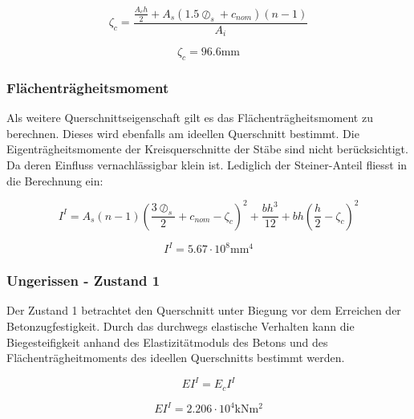 \documentclass[
  12pt,
  letterpaper,
  egregdoesnotlikesansseriftitles]{scrreprt}
\begin{document}
\begin{equation}\zeta_{c} = \frac{\frac{A_{c} h}{2} + A_{s} \left(1.5 \oslash_{s} + c_{nom}\right) \left(n - 1\right)}{A_{i}}\end{equation}

\begin{equation}\zeta_{c} = 96.6 \text{mm}\end{equation}

\hypertarget{fluxe4chentruxe4gheitsmoment}{%
\subsubsection{Flächenträgheitsmoment}\label{fluxe4chentruxe4gheitsmoment}}

Als weitere Querschnittseigenschaft gilt es das Flächenträgheitsmoment
zu berechnen. Dieses wird ebenfalls am ideellen Querschnitt bestimmt.
Die Eigenträgheitsmomente der Kreisquerschnitte der Stäbe sind nicht
berücksichtigt. Da deren Einfluss vernachlässigbar klein ist. Lediglich
der Steiner-Anteil fliesst in die Berechnung ein:

\begin{equation}I^{I} = A_{s} \left(n - 1\right) \left(\frac{3 \oslash_{s}}{2} + c_{nom} - \zeta_{c}\right)^{2} + \frac{b h^{3}}{12} + b h \left(\frac{h}{2} - \zeta_{c}\right)^{2}\end{equation}

\begin{equation}I^{I} = 5.67 \cdot 10^{8} \text{mm}^{4}\end{equation}

\hypertarget{ungerissen---zustand-1}{%
\subsubsection{Ungerissen - Zustand 1}\label{ungerissen---zustand-1}}

Der Zustand 1 betrachtet den Querschnitt unter Biegung vor dem Erreichen
der Betonzugfestigkeit. Durch das durchwegs elastische Verhalten kann
die Biegesteifigkeit anhand des Elastizitätmoduls des Betons und des
Flächenträgheitmoments des ideellen Querschnitts bestimmt werden.

\begin{equation}EI^{I} = E_{c} I^{I}\end{equation}

\begin{equation}EI^{I} = 2.206 \cdot 10^{4} \text{kN} \text{m}^{2}\end{equation}
\end{document}
